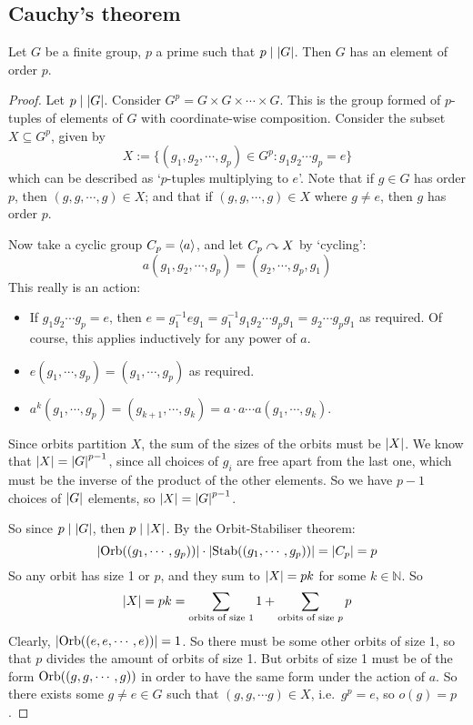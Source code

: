 \subsection{Cauchy's theorem}
\begin{theorem}
	Let \(G\) be a finite group, \(p\) a prime such that \(p \mid \abs{G}\).
	Then \(G\) has an element of order \(p\).
\end{theorem}
\begin{proof}
	Let \(p \mid \abs{G}\).
	Consider \(G^p = G \times G \times \cdots \times G\).
	This is the group formed of \(p\)-tuples of elements of \(G\) with coordinate-wise composition.
	Consider the subset \(X \subseteq G^p\), given by
	\[
		X := \{ (g_1, g_2, \cdots, g_p) \in G^p: g_1g_2\cdots g_p = e \}
	\]
	which can be described as `\(p\)-tuples multiplying to \(e\)'.
	Note that if \(g \in G\) has order \(p\), then \((g, g, \cdots, g) \in X\); and that if \((g, g, \cdots, g) \in X\) where \(g \neq e\), then \(g\) has order \(p\).

	Now take a cyclic group \(C_p = \langle{} a \rangle\), and let \(C_p \curvearrowright X\) by `cycling':
	\[
		a(g_1, g_2, \cdots, g_p) = (g_2, \cdots, g_p, g_1)
	\]
	This really is an action:
	\begin{itemize}
		\item If \(g_1g_2 \cdots g_p = e\), then \(e = g_1^{-1} e g_1 = g_1^{-1}g_1g_2 \cdots g_p g_1 = g_2 \cdots g_p g_1\) as required.
		      Of course, this applies inductively for any power of \(a\).
		\item \(e(g_1, \cdots, g_p) = (g_1, \cdots, g_p)\) as required.
		\item \(a^k(g_1, \cdots, g_p) = (g_{k+1}, \cdots, g_k) = a \cdot a \cdots a(g_1, \cdots, g_k)\).
	\end{itemize}
	Since orbits partition \(X\), the sum of the sizes of the orbits must be \(\abs{X}\).
	We know that \(\abs{X} = \abs{G}^{p-1}\), since all choices of \(g_i\) are free apart from the last one, which must be the inverse of the product of the other elements.
	So we have \(p-1\) choices of \(\abs{G}\) elements, so \(\abs{X} = \abs{G}^{p-1}\).

	So since \(p \mid \abs{G}\), then \(p \mid \abs{X}\).
	By the Orbit-Stabiliser theorem:
	\[
		\abs{\operatorname{Orb}((g_1, \cdots, g_p))} \cdot \abs{\operatorname{Stab}((g_1, \cdots, g_p))} = \abs{C_p} = p
	\]
	So any orbit has size 1 or \(p\), and they sum to \(\abs{X} = pk\) for some \(k \in \mathbb N\).
	So
	\[
		\abs{X} = pk = \sum_{\text{orbits of size 1}} 1 + \sum_{\text{orbits of size \(p\)}} p
	\]
	Clearly, \(\abs{\operatorname{Orb}((e, e, \cdots, e))} = 1\).
	So there must be some other orbits of size 1, so that \(p\) divides the amount of orbits of size 1.
	But orbits of size 1 must be of the form \(\operatorname{Orb}((g, g, \cdots, g))\) in order to have the same form under the action of \(a\).
	So there exists some \(g \neq e \in G\) such that \((g, g, \cdots g) \in X\), i.e.\ \(g^p = e\), so \(o(g) = p\).
\end{proof}

